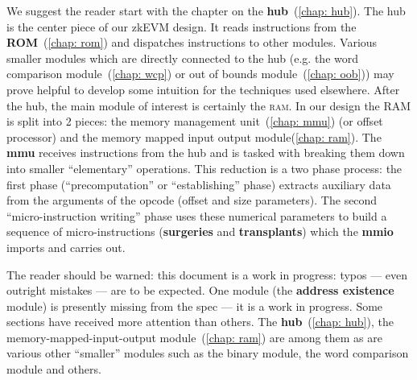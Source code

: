 We suggest the reader start with the chapter on the \textbf{hub}~(\ref{chap: hub}).
The hub is the center piece of our zkEVM design.
It reads instructions from the \textbf{ROM}~(\ref{chap: rom}) and dispatches instructions to other modules.
Various smaller modules which are directly connected to the hub (e.g. the word comparison module~(\ref{chap: wcp}) or out of bounds module~(\ref{chap: oob})) may prove helpful to develop some intuition for the techniques used elsewhere.
After the hub, the main module of interest is certainly the \textsc{ram}.
In our design the RAM is split into 2 pieces: the memory management unit~(\ref{chap: mmu}) (or offset processor) and the memory mapped input output module(\ref{chap: ram}).
The \textbf{mmu} receives instructions from the hub and is tasked with breaking them down into smaller ``elementary'' operations.
This reduction is a two phase process: the first phase (``precomputation'' or ``establishing'' phase) extracts auxiliary data from the arguments of the opcode (offset and size parameters).
The second ``micro-instruction writing'' phase uses these numerical parameters to build a sequence of micro-instructions (\textbf{surgeries} and \textbf{transplants}) which the \textbf{mmio} imports and carries out.

The reader should be warned: this document is a work in progress: typos --- even outright mistakes --- are to be expected.
One module (the \textbf{address existence} module) is presently missing from the spec --- it is a work in progress.
Some sections have received more attention than others.
The \textbf{hub}~(\ref{chap: hub}), the memory-mapped-input-output module~(\ref{chap: ram}) are among them as are various other ``smaller'' modules such as the binary module, the word comparison module and others.

